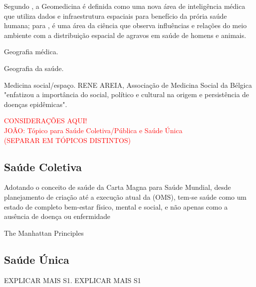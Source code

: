 \indent Segundo , a Geomedicina é definida como uma nova área de inteligência médica que utiliza dados e infraestrutura espaciais para benefício da prória saúde humana; para , é uma área da ciência que observa influências e relações do meio ambiente com a distribuição espacial de agravos em saúde de homens e animais.

\indent Geografia médica.

\indent Geografia da saúde.

\indent Medicina social/espaço. RENE AREIA, Associação de Medicina Social da Bélgica "enfatizou a importância do social, político e cultural na origem e persistência de doenças epidêmicas".

\begin{center}
\textcolor{red}{CONSIDERAÇÕES AQUI!}\\
\indent \textcolor{red}{JOÃO: Tópico para Saúde Coletiva/Pública e Saúde Única\\(SEPARAR EM TÓPICOS DISTINTOS)}\\
\end{center}


\subsection{Saúde Coletiva}

\indent Adotando o conceito de saúde da Carta Magna para Saúde Mundial, desde planejamento de criação até a execução atual da  (\acrshort{OMS}), tem-se saúde como um estado de completo bem-estar físico, mental e social, e não apenas como a ausência de doença ou enfermidade \cite{ParranHEALTH}

\indent The Manhattan Principles

\subsection{Saúde Única}

\indent EXPLICAR MAIS S1. EXPLICAR MAIS S1

